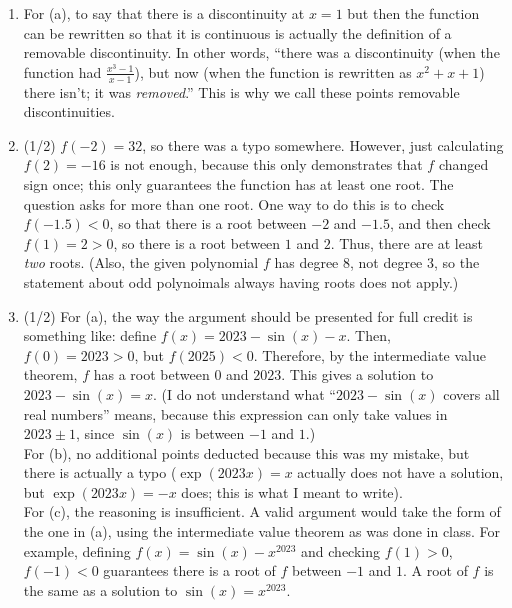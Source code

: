 \documentclass{article}
\begin{document}
\begin{enumerate}
	\item For (a), to say that there is a discontinuity at $x=1$ but then the function can be rewritten so that it is continuous is actually the definition of a removable discontinuity. In other words, ``there was a discontinuity (when the function had $\frac{x^{3} - 1}{x-1}$), but now (when the function is rewritten as $x^{2} + x + 1$) there isn't; it was \emph{removed}.'' This is why we call these points removable discontinuities.
	\item (1/2) $f(-2) = 32$, so there was a typo somewhere. However, just calculating $f(2) = -16$ is not enough, because this only demonstrates that $f$ changed sign once; this only guarantees the function has at least one root. The question asks for more than one root. One way to do this is to check $f(-1.5) < 0$, so that there is a root between $-2$ and $-1.5$, and then check $f(1) = 2 > 0$, so there is a root between $1$ and $2$. Thus, there are at least \emph{two} roots. (Also, the given polynomial $f$ has degree 8, not degree 3, so the statement about odd polynoimals always having roots does not apply.)
	\item (1/2) For (a), the way the argument should be presented for full credit is something like: define $f(x) = 2023 - \sin(x) - x$. Then, $f(0) = 2023 > 0$, but $f(2025) < 0$. Therefore, by the intermediate value theorem, $f$ has a root between $0$ and $2023$. This gives a solution to $2023 - \sin(x) = x$. (I do not understand what ``$2023 - \sin(x)$ covers all real numbers'' means, because this expression can only take values in $2023 \pm 1$, since $\sin(x)$ is between $-1$ and $1$.)\\
		For (b), no additional points deducted because this was my mistake, but there is actually a typo ($\operatorname{exp}(2023x) = x$ actually does not have a solution, but $\operatorname{exp}(2023x) = -x$ does; this is what I meant to write).\\
		For (c), the reasoning is insufficient. A valid argument would take the form of the one in (a), using the intermediate value theorem as was done in class. For example, defining $f(x) = \sin(x) - x^{2023}$ and checking $f(1) > 0$, $f(-1) < 0$ guarantees there is a root of $f$ between $-1$ and $1$. A root of $f$ is the same as a solution to $\sin(x) = x^{2023}$.
\end{enumerate}
\end{document}
